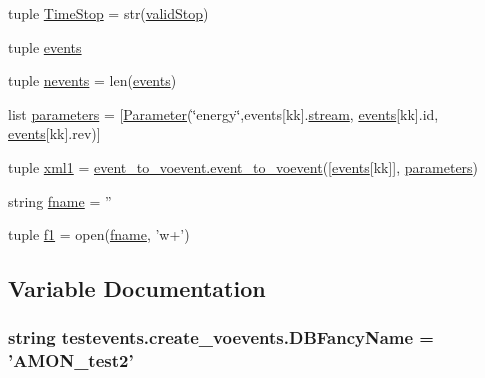 \begin{DoxyCompactItemize}
\item 
tuple \hyperlink{namespacetestevents_1_1create__voevents_a2ba47c08e33102e401a760206d7d1fe7}{Time\-Stop} = str(\hyperlink{namespacetestevents_1_1create__voevents_a80fe94b0ac338bc706910bebac4132aa}{valid\-Stop})
\item 
tuple \hyperlink{namespacetestevents_1_1create__voevents_ad445227e1dca6e875f1f85de9777d008}{events}
\item 
tuple \hyperlink{namespacetestevents_1_1create__voevents_a9d1fb9b932bfacc5ed0fa2b335d25917}{nevents} = len(\hyperlink{namespacetestevents_1_1create__voevents_ad445227e1dca6e875f1f85de9777d008}{events})
\item 
list \hyperlink{namespacetestevents_1_1create__voevents_a4fda3e759933451b530433ab406bbd2f}{parameters} = \mbox{[}\hyperlink{classamonpy_1_1dbase_1_1db__classes_1_1_parameter}{Parameter}(\char`\"{}energy\char`\"{},events\mbox{[}kk\mbox{]}.\hyperlink{db__mc__build_8sql_a67b7e9fc922cbf49b5ae3124240f4188}{stream}, \hyperlink{namespacetestevents_1_1create__voevents_ad445227e1dca6e875f1f85de9777d008}{events}\mbox{[}kk\mbox{]}.id, \hyperlink{namespacetestevents_1_1create__voevents_ad445227e1dca6e875f1f85de9777d008}{events}\mbox{[}kk\mbox{]}.rev)\mbox{]}
\item 
tuple \hyperlink{namespacetestevents_1_1create__voevents_ad8ad71a3c97e80e15265f9cdcf854921}{xml1} = \hyperlink{namespaceevent__to__voevent_a540d6b7d91d6033f3334987e1e0a7aeb}{event\-\_\-to\-\_\-voevent.\-event\-\_\-to\-\_\-voevent}(\mbox{[}\hyperlink{namespacetestevents_1_1create__voevents_ad445227e1dca6e875f1f85de9777d008}{events}\mbox{[}kk\mbox{]}\mbox{]}, \hyperlink{namespacetestevents_1_1create__voevents_a4fda3e759933451b530433ab406bbd2f}{parameters})
\item 
string \hyperlink{namespacetestevents_1_1create__voevents_a94eff63efc65e7054a0f943be84ca3e7}{fname} = ''
\item 
tuple \hyperlink{namespacetestevents_1_1create__voevents_ab8cf18f8fb2b4e2eccd7953918cb1760}{f1} = open(\hyperlink{namespacetestevents_1_1create__voevents_a94eff63efc65e7054a0f943be84ca3e7}{fname}, 'w+')
\end{DoxyCompactItemize}


\subsection{Variable Documentation}
\hypertarget{namespacetestevents_1_1create__voevents_afa107656f14779d5495d5591960e5fdf}{
\subsubsection[{D\-B\-Fancy\-Name}]{\setlength{\rightskip}{0pt plus 5cm}string testevents.\-create\-\_\-voevents.\-D\-B\-Fancy\-Name = '{\bf A\-M\-O\-N\-\_\-test2}'}}\label{namespacetestevents_1_1create__voevents_afa107656f14779d5495d5591960e5fdf}


